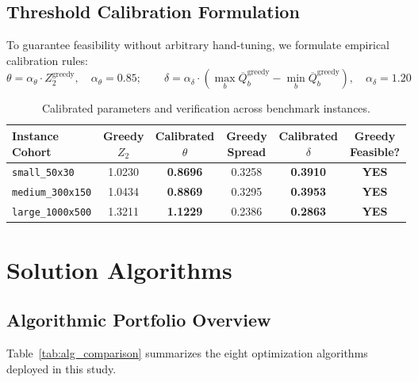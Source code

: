 \documentclass[11pt,a4paper,oneside]{report}
\begin{document}
\section{Threshold Calibration Formulation}
To guarantee feasibility without arbitrary hand-tuning, we formulate empirical calibration rules:
\begin{equation}
    \theta = \alpha_{\theta} \cdot Z_2^{\text{greedy}}, \quad \alpha_{\theta} = 0.85; \qquad \delta = \alpha_{\delta} \cdot \left(\max_b \overline{Q}_b^{\text{greedy}} - \min_b \overline{Q}_b^{\text{greedy}}\right), \quad \alpha_{\delta} = 1.20
\end{equation}

\begin{table}[htbp]
\centering
\caption{Calibrated parameters and verification across benchmark instances.}
\label{tab:cal_results}
\begin{tabularx}{\textwidth}{lccccc}
\toprule
\textbf{Instance Cohort} & \textbf{Greedy $Z_2$} & \textbf{Calibrated $\theta$} & \textbf{Greedy Spread} & \textbf{Calibrated $\delta$} & \textbf{Greedy Feasible?} \\
\midrule
\texttt{small\_50x30} & 1.0230 & \textbf{0.8696} & 0.3258 & \textbf{0.3910} & \textbf{YES} \\
\texttt{medium\_300x150} & 1.0434 & \textbf{0.8869} & 0.3295 & \textbf{0.3953} & \textbf{YES} \\
\texttt{large\_1000x500} & 1.3211 & \textbf{1.1229} & 0.2386 & \textbf{0.2863} & \textbf{YES} \\
\bottomrule
\end{tabularx}
\end{table}

\chapter{Solution Algorithms}

\section{Algorithmic Portfolio Overview}
Table~\ref{tab:alg_comparison} summarizes the eight optimization algorithms deployed in this study.
\end{document}
